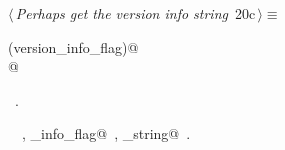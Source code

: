 \documentclass[a4paper]{report}
\begin{document}
\begin{flushleft} \small
\begin{minipage}{\linewidth}\label{scrap28}\raggedright\small
{} $\langle\,${\it Perhaps get the version info string}\nobreak\ {\footnotesize {20c}}$\,\rangle\equiv$
\vspace{-1ex}
\begin{list}{}{} \item
\mbox{}\verb@if (version_info_flag)@\\
\mbox{}@\\
\mbox{}\verb@@{\NWsep}
\end{list}
\vspace{-1.5ex}
\footnotesize
\begin{list}{}{\setlength{\itemsep}{-\parsep}\setlength{\itemindent}{-\leftmargin}}
\item \NWtxtMacroRefIn\ .
\item \NWtxtIdentsUsed\nobreak\  \verb@FALSE@\nobreak\ , \verb@version_info_flag@\nobreak\ , \verb@version_string@\nobreak\ .
\item{}
\end{list}
\end{minipage}\vspace{4ex}
\end{flushleft}
\end{document}
